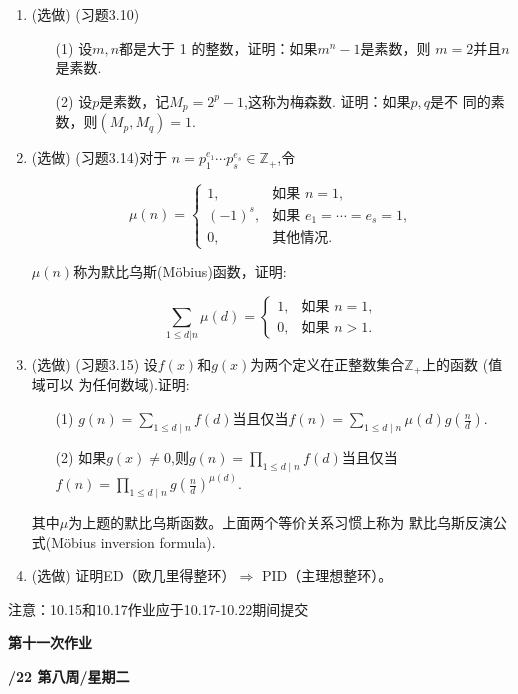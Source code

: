 \documentclass[a4paper,12pt]{article}
\begin{document}
\begin{enumerate}
 \item {\color{red} (选做)} (习题3.10)
  \begin{itemize}
 \item[(1)]设$m,n$都是大于 1 的整数，证明：如果$m^n-1$是素数，则
$m=2$并且$n$是素数.
\item[(2)]设$p$是素数，记$M_p=2^p-1$,这称为梅森数. 证明：如果$p,q$是不
同的素数，则$(M_p,M_q)=1.$
\end{itemize}
 \item {\color{red} (选做)} (习题3.14)对于 $n=p_1^{e_1}\cdots p_s^{e_s}\in\mathbb{Z}_+$,令


$$\mu\left(n\right)=\begin{cases}1,&\text{如果 }n=1,\\\left(-1\right)^{s},&\text{如果 }e_{1}=\cdots=e_{s}=1,\\0,&\text{其他情况}.\end{cases}$$


$\mu(n)$称为默比乌斯(Möbius)函数，证明:

$$\left.\sum_{1\leqslant d|n}\mu\left(d\right)=\left\{\begin{matrix}1,&\text{如果 }n=1,\\0,&\text{如果 }n>1.\end{matrix}\right.\right.$$
 \item {\color{red} (选做)} (习题3.15) 设$f(x)$和$g(x)$为两个定义在正整数集合$\mathbb{Z}_+$上的函数 (值域可以
为任何数域).证明:

\begin{itemize}
    \item[(1)] $g(n)=\sum_{1\leqslant d\mid n} f(d)$当且仅当$f(n)=\sum_{1\leqslant d\mid n}\mu(d)g(\frac n d).$
\item[(2)]如果$g\left(x\right)\neq0$,则$g(n)=\prod_{1\leqslant d\mid n}f(d) $当且仅当$f(n)=\prod_{1\leqslant d\mid n}g(\frac nd)^{\mu(d)}.$
\end{itemize}
其中$\mu$为上题的默比乌斯函数。上面两个等价关系习惯上称为 默比乌斯反演公式(Möbius inversion formula).

 \item  {\color{red} (选做)} 证明ED（欧几里得整环）$\Rightarrow$ PID（主理想整环）。
 
\end{enumerate}


{\color{red} 注意：10.15和10.17作业应于10.17-10.22期间提交}

\newpage
\head

\begin{center} %
	{\Large \bf 第十一次作业} %
	\vspace{2mm}
	
	{\bf{}/22 \quad  第八周/星期二} %
\end{center} 
\end{document}
